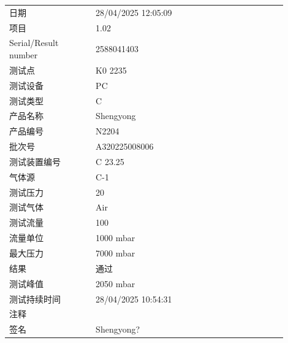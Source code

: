 \documentclass[UTF8,10pt,a4paper,fontset=fandol]{ctexart}
\newcommand{\fieldvalue}[1]{#1}
\newcommand{\handwritten}[1]{#1}
\begin{document}
\begin{tabular}{@{}p{0.28\linewidth}p{0.62\linewidth}@{}}
日期 &
\fieldvalue{28/04/2025 12:05:09} \\[2pt]
项目 &
\fieldvalue{1.02} \\[2pt]
Serial/Result number &
\fieldvalue{2588041403} \\[2pt]
测试点 &
\fieldvalue{K0 2235} \\[2pt]
测试设备 &
\fieldvalue{PC} \\[2pt]
测试类型 &
\fieldvalue{C} \\[2pt]
产品名称 &
\fieldvalue{Shengyong} \\[2pt]
产品编号 &
\fieldvalue{N2204} \\[2pt]
批次号 &
\fieldvalue{A320225008006} \\[2pt]
测试装置编号 &
\fieldvalue{C 23.25} \\[2pt]
气体源 &
\fieldvalue{C-1} \\[2pt]
测试压力 &
\fieldvalue{20} \\[2pt]
测试气体 &
\fieldvalue{Air} \\[2pt]
测试流量 &
\fieldvalue{100} \\[2pt]
流量单位 &
\fieldvalue{1000 mbar} \\[2pt]
最大压力 &
\fieldvalue{7000 mbar} \\[2pt]
结果 &
\fieldvalue{通过} \\[2pt]
测试峰值 &
\fieldvalue{2050 mbar} \\[2pt]
测试持续时间 &
\fieldvalue{28/04/2025 10:54:31} \\[2pt]
注释 & \\[2pt]
签名 &
\fieldvalue{\handwritten{Shengyong?}}
\end{tabular}
\end{document}
